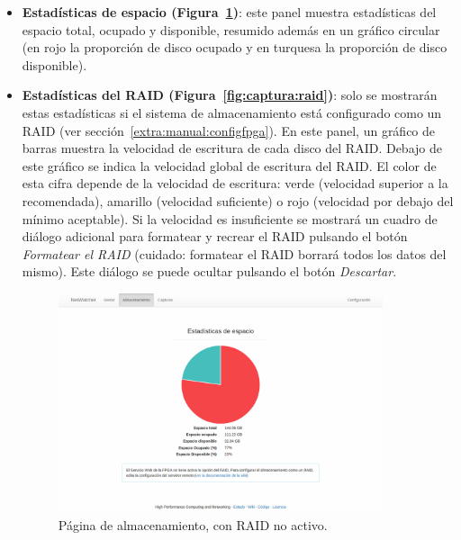 \begin{itemize}
\item \textbf{Estadísticas de espacio (Figura~\ref{fig:captura:espacio})}: este panel muestra estadísticas del espacio total, ocupado y disponible, resumido además en un gráfico circular (en rojo la proporción de disco ocupado y en turquesa la proporción de disco disponible).

\item \textbf{Estadísticas del \gls{RAID} (Figura~\ref{fig:captura:raid})}: solo se mostrarán estas estadísticas si el sistema de almacenamiento está configurado como un \gls{RAID} (ver sección~\ref{extra:manual:configfpga}).
En este panel, un gráfico de barras muestra la velocidad de escritura de cada disco del \gls{RAID}.
Debajo de este gráfico se indica la velocidad global de escritura del \gls{RAID}.
El color de esta cifra depende de la velocidad de escritura: verde (velocidad superior a la recomendada), amarillo (velocidad suficiente) o rojo (velocidad por debajo del mínimo aceptable).
Si la velocidad es insuficiente se mostrará un cuadro de diálogo adicional para formatear y recrear el \gls{RAID} pulsando el botón \textit{Formatear el \gls{RAID}} (cuidado: formatear el \gls{RAID} borrará todos los datos del mismo).
Este diálogo se puede ocultar pulsando el botón \textit{Descartar}.

\begin{figure}[!htp]
  \centering
  \includegraphics[width=0.9\textwidth,clip=true]{graphics/capturas/almacenamiento_espacio}
  \caption{Página de almacenamiento, con \gls{RAID} no activo.}
  \label{fig:captura:espacio}
\end{figure}


\end{itemize}
